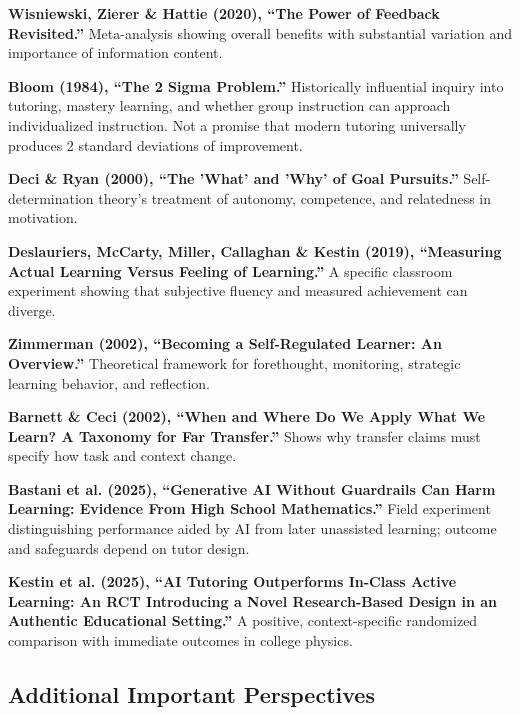 \begin{enumerate}[label={[\textbf{R\arabic*}]}]
    \item \textbf{Wisniewski, Zierer \& Hattie (2020), ``The Power of Feedback Revisited.''} Meta-analysis showing overall benefits with substantial variation and importance of information content.
    \item \textbf{Bloom (1984), ``The 2 Sigma Problem.''} Historically influential inquiry into tutoring, mastery learning, and whether group instruction can approach individualized instruction. Not a promise that modern tutoring universally produces 2 standard deviations of improvement.
    \item \textbf{Deci \& Ryan (2000), ``The 'What' and 'Why' of Goal Pursuits.''} Self-determination theory's treatment of autonomy, competence, and relatedness in motivation.
    \item \textbf{Deslauriers, McCarty, Miller, Callaghan \& Kestin (2019), ``Measuring Actual Learning Versus Feeling of Learning.''} A specific classroom experiment showing that subjective fluency and measured achievement can diverge.
    \item \textbf{Zimmerman (2002), ``Becoming a Self-Regulated Learner: An Overview.''} Theoretical framework for forethought, monitoring, strategic learning behavior, and reflection.
    \item \textbf{Barnett \& Ceci (2002), ``When and Where Do We Apply What We Learn? A Taxonomy for Far Transfer.''} Shows why transfer claims must specify how task and context change.
    \item \textbf{Bastani et al. (2025), ``Generative AI Without Guardrails Can Harm Learning: Evidence From High School Mathematics.''} Field experiment distinguishing performance aided by AI from later unassisted learning; outcome and safeguards depend on tutor design.
    \item \textbf{Kestin et al. (2025), ``AI Tutoring Outperforms In-Class Active Learning: An RCT Introducing a Novel Research-Based Design in an Authentic Educational Setting.''} A positive, context-specific randomized comparison with immediate outcomes in college physics.
\end{enumerate}

\subsection*{Additional Important Perspectives}

